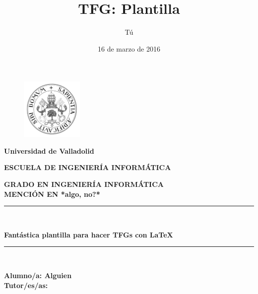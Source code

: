\documentclass[openright,twoside,10pt]{book}
\date{16 de marzo de 2016}
\author{Tú}
\title{TFG: Plantilla}
\begin{document}
\begin{titlepage}

\begin{center}
\vspace*{-1in}
\begin{figure}[htb]
\begin{center}
\includegraphics[width=3cm]{./img/logo}
\end{center}
\end{figure}
\begin{large}
\textbf{Universidad de Valladolid}
\end{large}

\vspace*{0.15in}

\vspace*{0.6in}
\begin{large}
\textbf{ESCUELA DE INGENIERÍA INFORMÁTICA}

\end{large}
\vspace*{0.2in}
\textbf{ GRADO EN INGENIERÍA INFORMÁTICA}\\
\textbf{ MENCIÓN EN *algo, no?* }
\vspace*{0.5in}
\rule{140mm}{0.1mm}\\
\vspace*{0.3in}
\begin{large}
\textbf{{\LARGE Fantástica plantilla para hacer TFGs con \LaTeX\\}}
\end{large}
\vspace*{0.6in}
\rule{140mm}{0.1mm}\\
\vspace*{2in}
\begin{large}
\begin{flushright}
\textbf{Alumno/a: Alguien \\
\vspace*{0.3in}
Tutor/es/as: }
\end{flushright}
\end{large}
\end{center}

\end{titlepage}
\end{document}
